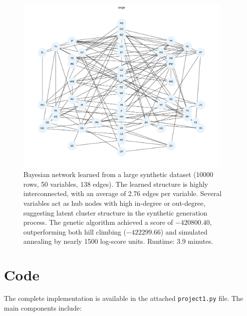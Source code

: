 \documentclass[twoside,11pt]{article}
\begin{document}
\begin{figure}[h]
    \centering
    \includegraphics[width=0.95\textwidth]{large_graph.pdf}
    \caption{Bayesian network learned from a large synthetic dataset (10000 rows, 50 variables, 138 edges). The learned structure is highly interconnected, with an average of 2.76 edges per variable. Several variables act as hub nodes with high in-degree or out-degree, suggesting latent cluster structure in the synthetic generation process. The genetic algorithm achieved a score of $-420800.40$, outperforming both hill climbing ($-422299.66$) and simulated annealing by nearly 1500 log-score units. Runtime: 3.9 minutes.}
\end{figure}


\section{Code}

The complete implementation is available in the attached \texttt{project1.py} file. The main components include:
\end{document}
